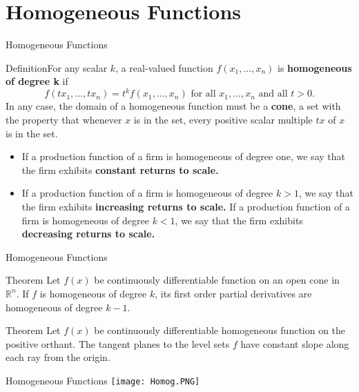 \documentclass{beamer}
\begin{document}
\section{Homogeneous Functions}
\begin{frame}{Homogeneous Functions}
\begin{block}
    {Definition}For any scalar $k$, a real-valued function $f(x_1,..., x_n)$ is \textbf{homogeneous of degree k} if 
\[f(tx_1,...,tx_n)=t^kf(x_1,..., x_n) \text{ for all }x_1,..., x_n \text{ and all }t>0.
\]
In any case, the domain of a homogeneous function must be a \textbf{cone}, a set with the property that whenever $x$ is in the set, every positive scalar multiple $tx$ of $x$ is in the set. 
\end{block}
    \begin{itemize}
        \item If a production function of a firm is homogeneous of degree one, we say that the firm exhibits \textbf{constant returns to scale.}
        \item If a production function of a firm is homogeneous of degree $k>1$, we say that the firm exhibits \textbf{increasing returns to scale.}
        If a production function of a firm is homogeneous of degree $k<1$, we say that the firm exhibits \textbf{decreasing returns to scale.}
    \end{itemize}
    
    
    
\end{frame}

\begin{frame}{Homogeneous Functions}

\begin{block}{Theorem }
 Let $f(x)$ be continuously differentiable function on an open cone in $\mathbb{R}^n$. If $f$ is homogeneous of degree $k$, its first order partial derivatives are homogeneous of degree $k-1$.

\end{block}
\begin{block}{Theorem }
Let $f(x)$ be continuously differentiable homogeneous function on the positive orthant. The tangent planes to the level sets $f$ have constant slope along each ray from the origin.
\end{block}
\end{frame}

\begin{frame}{Homogeneous Functions}
\texttt{[image: Homog.PNG]}
\end{frame}
\end{document}
